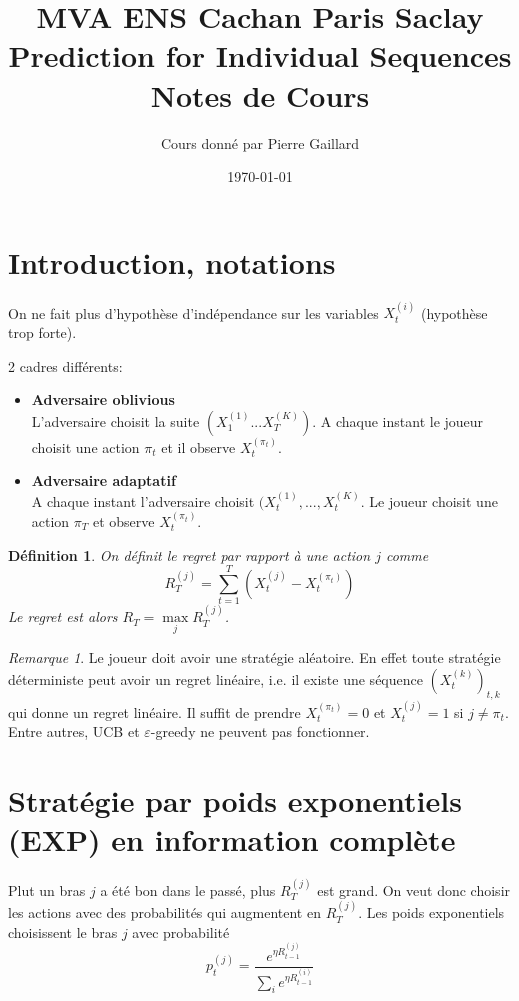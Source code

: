 \documentclass{article}
\title{%
  \large MVA ENS Cachan Paris Saclay \\
  \huge Prediction for Individual Sequences\\ Notes de Cours \\
}
\author{%
  Cours donné par Pierre Gaillard
}
\date{\today}
\newtheorem{definition}{Définition}[section]
\theoremstyle{remark}
\theoremstyle{remark}
\newtheorem{remark}{Remarque}[section]
\begin{document}
\maketitle

\section*{Introduction, notations}

On ne fait plus d'hypothèse d'indépendance sur les variables $X_t^{(i)}$ (hypothèse trop forte).

2 cadres différents:
\begin{itemize}
\item
\textbf{Adversaire oblivious}\\
L'adversaire choisit la suite $(X_1^{(1)}...X_T^{(K)})$. A chaque instant le joueur choisit une action $\pi_t$ et il observe $X_t^{(\pi_t)}$.
\item
\textbf{Adversaire adaptatif}\\
A chaque instant l'adversaire choisit $(X_t^{(1)},..., X_t^{(K)}$. Le joueur choisit une action $\pi_T$ et observe $X_t^{(\pi_t)}$.
\end{itemize}

\begin{definition}
On définit le regret par rapport à une action $j$ comme
\begin{equation*}
R_T^{(j)} = \sum\limits_{t=1}^T \left(X_t^{(j)}-X_t^{(\pi_t)}\right)
\end{equation*}
Le regret est alors $R_T=\max\limits_j R_T^{(j)}$.
\end{definition}

\begin{remark}
Le joueur doit avoir une stratégie aléatoire. En effet toute stratégie déterministe peut avoir un regret linéaire, i.e. il existe une séquence $(X_t^{(k)})_{t,k}$ qui donne un regret linéaire. Il suffit de prendre $X_t^{(\pi_t)}=0$ et $X_t^{(j)}=1$ si $j\neq \pi_t$. Entre autres, UCB et $\varepsilon$-greedy ne peuvent pas fonctionner.
\end{remark}

\section{Stratégie par poids exponentiels (EXP) en information complète}
Plut un bras $j$ a été bon dans le passé, plus $R_T^{(j)}$ est grand. On veut donc choisir les actions avec des probabilités qui augmentent en $R_T^{(j)}$. Les poids exponentiels choisissent le bras $j$ avec probabilité
\begin{equation*}
    p_t^{(j)} = \frac{e^{\eta R_{t-1}^{(j)}}}{\sum\limits_i e^{\eta R_{t-1}^{(i)}}}
\end{equation*}
\end{document}
